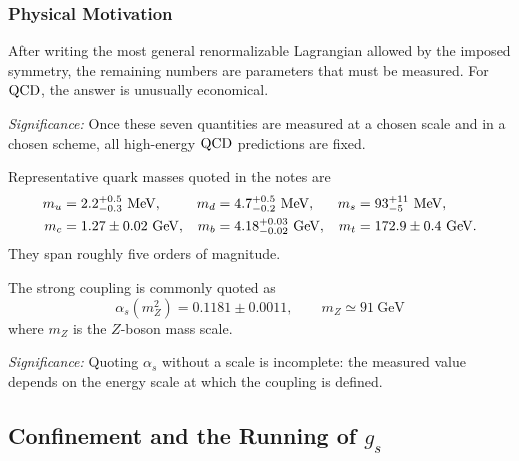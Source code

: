 \documentclass[../main.tex]{subfiles}
\begin{document}
\subsubsection*{Physical Motivation}

After writing the most general renormalizable Lagrangian allowed by the imposed symmetry, the remaining numbers are parameters that must be measured. For $\mathrm{QCD}$, the answer is unusually economical.


\textit{Significance:} Once these seven quantities are measured at a chosen scale and in a chosen scheme, all high-energy $\mathrm{QCD}$ predictions are fixed.

Representative quark masses quoted in the notes are
\begin{align}
  m_u&=2.2^{+0.5}_{-0.3}\ \mathrm{MeV},&
  m_d&=4.7^{+0.5}_{-0.2}\ \mathrm{MeV},&
  m_s&=93^{+11}_{-5}\ \mathrm{MeV},
  \notag\\
  m_c&=1.27\pm0.02\ \mathrm{GeV},&
  m_b&=4.18^{+0.03}_{-0.02}\ \mathrm{GeV},&
  m_t&=172.9\pm0.4\ \mathrm{GeV}.
  \label{eq:lec14:quark_masses}
\end{align}
They span roughly five orders of magnitude.


The strong coupling is commonly quoted as
\begin{equation}
  \boxed{\;\alpha_s(m_Z^2)=0.1181\pm0.0011,\qquad m_Z\simeq91\ \mathrm{GeV}\;}
  \label{eq:lec14:alpha_s_mz}
\end{equation}
where $m_Z$ is the $Z$-boson mass scale.

\textit{Significance:} Quoting $\alpha_s$ without a scale is incomplete: the measured value depends on the energy scale at which the coupling is defined.

\subsection{Confinement and the Running of \texorpdfstring{$g_s$}{gs}}\label{sec:lec14:confinement}
\end{document}
